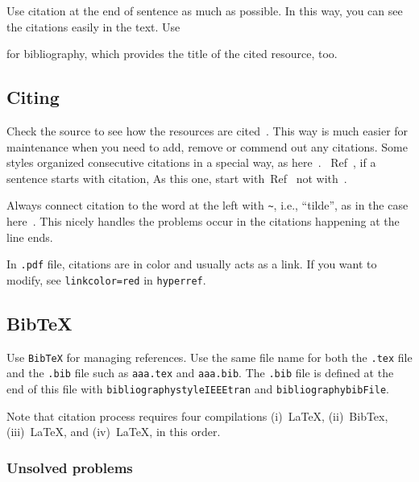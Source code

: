 \documentclass[10pt,journal,compsoc]{IEEEtran}
\newcommand{\refcite}[1]{Ref~\cite{#1}}
\newcommand{\hCode}[1]{\texttt{{\footnotesize #1}}}
\theoremstyle{plain}
\theoremstyle{definition}
\theoremstyle{remark}
\begin{document}
Use citation at  the end of sentence as much as possible.
In this way, 
you can see the citations easily in the text.
Use 
{\footnotesize{\verb!!}
for bibliography,
which provides the title of the cited resource, too. 




\subsection{Citing}

Check the source to see how the resources are cited~\cite{%
	chomsky1993,%
	wikiComplexNetwork}.
This way is much easier for maintenance
when you need to add, remove or commend out any citations.
Some styles organized consecutive citations in a special way,
as here~\cite{%
	feynman1965feynman,
	feynman2018computation,
	feynman2018gravitation,
	feynman1985surely}.
~\refcite{%
	acemoglu2010},
if a sentence starts with citation,
As this one,
start with~\refcite{%
	acemoglu2010}  
not with~\cite{%
	acemoglu2010}.

Always connect citation to the word at the left with \verb!~!, 
i.e., ``tilde'', 
as in the case here~\cite{%
	acemoglu2010}.
This nicely handles the problems occur in the citations happening at the line ends.

In \hCode{.pdf} file, citations are in color and usually acts as a link.
If you want to modify,
see 
\hCode{linkcolor=red}
in 
\hCode{hyperref}.




\subsection{BibTeX}

Use \hCode{BibTeX} for managing references.
Use the same file name for both the \hCode{.tex}  file and the \hCode{.bib} file such as
\hCode{aaa.tex} and \hCode{aaa.bib}.
The \hCode{.bib} file is defined at the end of this file with
\hCode{bibliographystyle{IEEEtran}} and
\hCode{bibliography{bibFile}}.

Note that citation process requires four compilations 
(i)~LaTeX, 
(ii)~BibTex, 
(iii)~LaTeX, and  
(iv)~LaTeX,
in this order.




\subsubsection{Unsolved problems}

}
\end{document}
